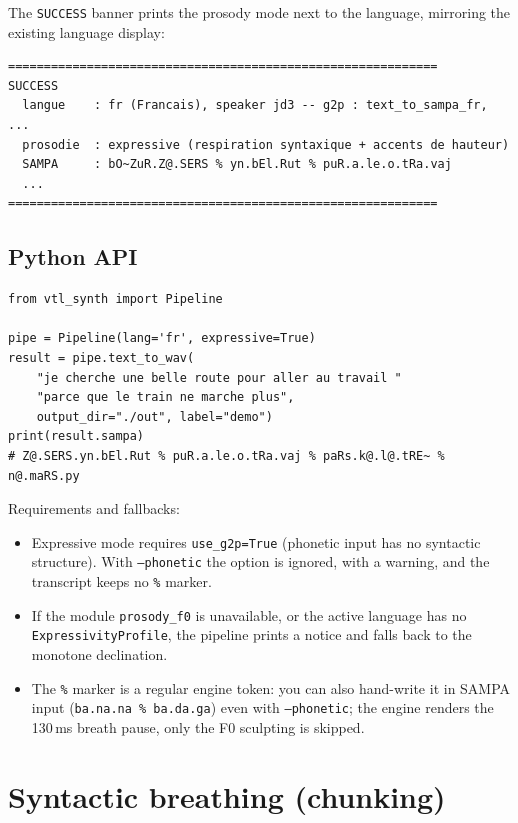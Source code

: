 \documentclass[11pt,a4paper]{article}
\newcommand{\ks}[1]{\texttt{#1}}
\begin{document}
The \texttt{SUCCESS} banner prints the prosody mode next to the
language, mirroring the existing language display:

\begin{lstlisting}[style=verbatim]
============================================================
SUCCESS
  langue    : fr (Francais), speaker jd3 -- g2p : text_to_sampa_fr, ...
  prosodie  : expressive (respiration syntaxique + accents de hauteur)
  SAMPA     : bO~ZuR.Z@.SERS % yn.bEl.Rut % puR.a.le.o.tRa.vaj
  ...
============================================================
\end{lstlisting}

\subsection{Python API}

\begin{lstlisting}[style=python]
from vtl_synth import Pipeline

pipe = Pipeline(lang='fr', expressive=True)
result = pipe.text_to_wav(
    "je cherche une belle route pour aller au travail "
    "parce que le train ne marche plus",
    output_dir="./out", label="demo")
print(result.sampa)
# Z@.SERS.yn.bEl.Rut % puR.a.le.o.tRa.vaj % paRs.k@.l@.tRE~ % n@.maRS.py
\end{lstlisting}

Requirements and fallbacks:

\begin{itemize}[itemsep=2pt]
\item Expressive mode requires \texttt{use\_g2p=True} (phonetic
  input has no syntactic structure). With \texttt{--phonetic} the
  option is ignored, with a warning, and the transcript keeps no
  \ks{\%} marker.
\item If the module \texttt{prosody\_f0} is unavailable, or the
  active language has no \texttt{ExpressivityProfile}, the pipeline
  prints a notice and falls back to the monotone declination.
\item The \ks{\%} marker is a regular engine token: you can also
  hand-write it in SAMPA input (\texttt{ba.na.na \% ba.da.ga}) even
  with \texttt{--phonetic}; the engine renders the 130\,ms breath
  pause, only the F0 sculpting is skipped.
\end{itemize}

\section{Syntactic breathing (chunking)}\label{sec:breathing}
\end{document}
